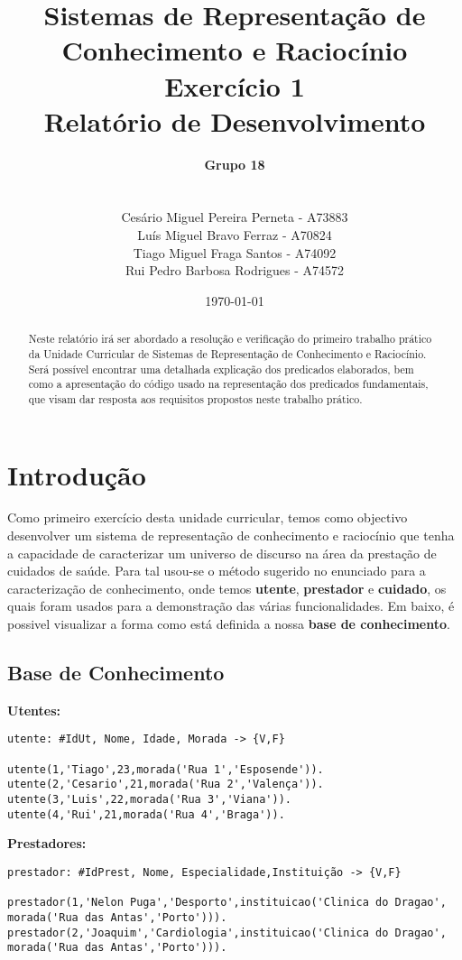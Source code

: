 \documentclass{report}
\title{Sistemas de Representação de Conhecimento e Raciocínio\\ \textbf{Exercício 1}\\ Relatório de Desenvolvimento}
\author{\textbf{Grupo 18}\\
\\
\\
Cesário Miguel Pereira Perneta - A73883
\\
Luís Miguel Bravo Ferraz - A70824
\\
Tiago Miguel Fraga Santos - A74092
\\
Rui Pedro Barbosa Rodrigues - A74572}
\date{\today}
\def\titulo#1{\section{#1}}
\begin{document}
 
 
\maketitle
 
\begin{abstract}
Neste relatório irá ser abordado a resolução e verificação do primeiro trabalho prático da Unidade Curricular de Sistemas de Representação de Conhecimento e Raciocínio.
Será possível encontrar uma detalhada explicação dos predicados elaborados, bem como a apresentação do código usado na representação dos predicados fundamentais, que visam dar resposta aos requisitos propostos neste trabalho prático.
\end{abstract}
 
\tableofcontents

\chapter{Introdução} \label{intro}

Como primeiro exercício desta unidade curricular, temos como objectivo desenvolver um sistema de representação de conhecimento e raciocínio que tenha a capacidade de caracterizar um universo de discurso na área da prestação de cuidados de saúde. Para tal usou-se o método sugerido no enunciado para a caracterização de conhecimento, onde temos \textbf{utente}, \textbf{prestador} e \textbf{cuidado}, os quais foram usados para a demonstração das várias funcionalidades. Em baixo, é possivel visualizar a forma como está definida a nossa \textbf{base de conhecimento}.

\titulo{Base de Conhecimento}
\bigbreak
\textbf{Utentes:}
\begin{verbatim}
utente: #IdUt, Nome, Idade, Morada -> {V,F}

utente(1,'Tiago',23,morada('Rua 1','Esposende')).
utente(2,'Cesario',21,morada('Rua 2','Valença')).
utente(3,'Luis',22,morada('Rua 3','Viana')).
utente(4,'Rui',21,morada('Rua 4','Braga')).
\end{verbatim}

\textbf{Prestadores:}
\begin{verbatim}
prestador: #IdPrest, Nome, Especialidade,Instituição -> {V,F}

prestador(1,'Nelon Puga','Desporto',instituicao('Clinica do Dragao', morada('Rua das Antas','Porto'))).
prestador(2,'Joaquim','Cardiologia',instituicao('Clinica do Dragao', morada('Rua das Antas','Porto'))).
\end{verbatim}
\end{document}
